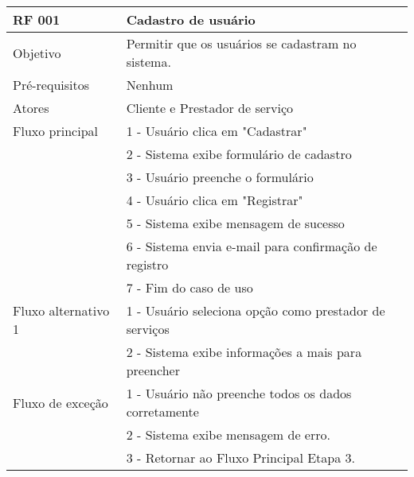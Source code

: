 \documentclass{article}
\begin{document}
\begin{table}[h!]
  \begin{center}
    \label{tab:table3}
    \begin{tabular}{|l|l|}
      \hline
      \textbf{RF 001} & \textbf{Cadastro de usuário}\\
      \hline
      Objetivo          & Permitir que os usuários se cadastram no sistema. \\
      \hline
      Pré-requisitos    & Nenhum \\
      \hline
      Atores            & Cliente e Prestador de serviço \\
      \hline
      Fluxo principal   & 1 - Usuário clica em "Cadastrar" \\
                        & 2 - Sistema exibe formulário de cadastro \\
                        & 3 - Usuário preenche o formulário \\
                        & 4 - Usuário clica em "Registrar" \\
                        & 5 - Sistema exibe mensagem de sucesso \\
                        & 6 - Sistema envia e-mail para confirmação de registro \\
                        & 7 - Fim do caso de uso \\
      \hline
      Fluxo alternativo 1 & 1 - Usuário seleciona opção como                                  prestador de serviços \\
                          & 2 - Sistema exibe informações a mais          para preencher \\
      \hline
      Fluxo de exceção & 1 - Usuário não preenche todos os dados                           corretamente \\
                       & 2 - Sistema exibe mensagem de erro. \\
                       & 3 - Retornar ao Fluxo Principal Etapa 3. \\
      \hline
    \end{tabular}
  \end{center}
\end{table}
\end{document}
